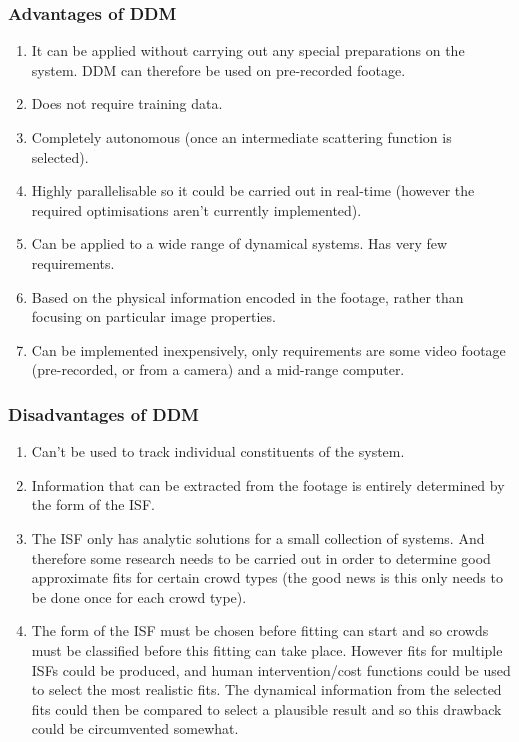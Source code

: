 \documentclass[10pt]{article}
\begin{document}
\subsubsection{Advantages of DDM}
\begin{enumerate}
\item It can be applied without carrying out any special preparations on the system. DDM can therefore be used on pre-recorded footage.
\item Does not require training data.
\item Completely autonomous (once an intermediate scattering function is selected).
\item Highly parallelisable so it could be carried out in real-time (however the required optimisations aren't currently implemented).
\item Can be applied to a wide range of dynamical systems. Has very few requirements.
\item Based on the physical information encoded in the footage, rather than focusing on particular image properties.
\item Can be implemented inexpensively, only requirements are some video footage (pre-recorded, or from a camera) and a mid-range computer.
\end{enumerate}

\subsubsection{Disadvantages of DDM}
\begin{enumerate}
\item Can't be used to track individual constituents of the system.
\item Information that can be extracted from the footage is entirely determined by the form of the ISF.
\item The ISF only has analytic solutions for a small collection of systems. And therefore some research needs to be carried out in order to determine good approximate fits for certain crowd types (the good news is this only needs to be done once for each crowd type).
\item The form of the ISF must be chosen before fitting can start and so crowds must be classified before this fitting can take place. However fits for multiple ISFs could be produced, and human intervention/cost functions could be used to select the most realistic fits. The dynamical information from the selected fits could then be compared to select a plausible result and so this drawback could be circumvented somewhat.
\end{enumerate}
\end{document}
